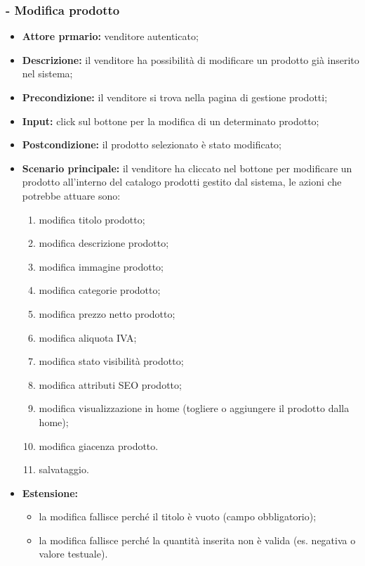 \stepsubUserCase
\subsubsection{- Modifica  prodotto}
\begin{itemize}
    \item \textbf{Attore prmario:} venditore autenticato;
    \item \textbf{Descrizione:} il venditore ha possibilità di modificare un prodotto già inserito nel sistema;
    \item \textbf{Precondizione:} il venditore si trova nella pagina di gestione prodotti;
    \item \textbf{Input:} click sul bottone per la modifica di un determinato prodotto;
    \item \textbf{Postcondizione:} il prodotto selezionato è stato modificato;
    \item \textbf{Scenario principale:} il venditore ha cliccato nel bottone per modificare un prodotto all’interno del catalogo prodotti gestito dal sistema, le azioni che potrebbe attuare sono:
          \begin{enumerate}
              \item modifica titolo prodotto;
              \item modifica descrizione prodotto;
              \item modifica immagine prodotto;
              \item modifica categorie prodotto;
              \item modifica prezzo netto prodotto;
              \item modifica aliquota IVA;
              \item modifica stato visibilità prodotto;
              \item modifica attributi SEO prodotto;
              \item modifica visualizzazione in home (togliere o aggiungere il prodotto dalla home);
              \item modifica giacenza prodotto.
              \item salvataggio.
          \end{enumerate}
    \item \textbf{Estensione:}
          \begin{itemize}
              \item la modifica fallisce perché il titolo è vuoto (campo obbligatorio);
              \item la modifica fallisce perché la quantità inserita non è valida (es. negativa o valore testuale).
          \end{itemize}
\end{itemize}

